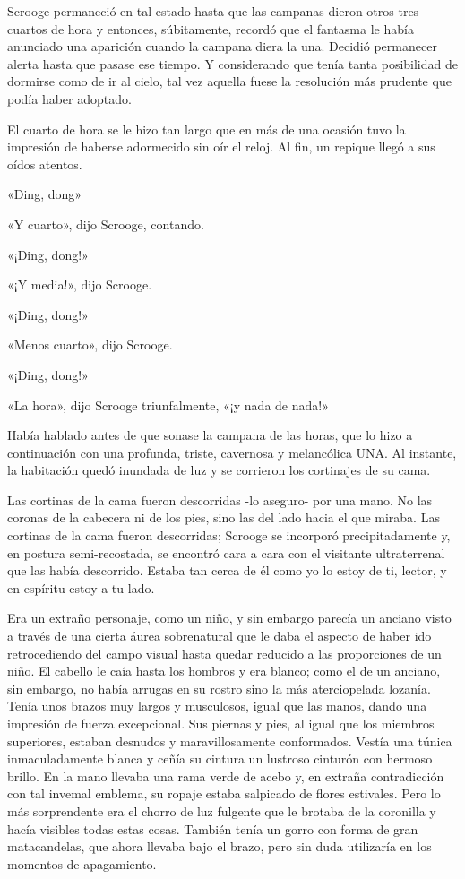 \documentclass{novela}
\begin{document}
 Scrooge permaneció en tal estado hasta que las campanas dieron otros tres cuartos de hora y entonces, súbitamente, recordó que el fantasma le había anunciado una aparición cuando la campana diera la una. Decidió permanecer alerta hasta que pasase ese tiempo. Y considerando que tenía tanta posibilidad de dormirse como de ir al cielo, tal vez aquella fuese la resolución más prudente que podía haber adoptado.

 El cuarto de hora se le hizo tan largo que en más de una ocasión tuvo la impresión de haberse adormecido sin oír el reloj. Al fin, un repique llegó a sus oídos atentos.

 «Ding, dong»

 «Y cuarto», dijo Scrooge, contando.

 «¡Ding, dong!»

 «¡Y media!», dijo Scrooge.





 «¡Ding, dong!»

 «Menos cuarto», dijo Scrooge.

 «¡Ding, dong!»

 «La hora», dijo Scrooge triunfalmente, «¡y nada de nada!»

 Había hablado antes de que sonase la campana de las horas, que lo hizo a continuación con una profunda, triste, cavernosa y melancólica UNA\@. Al instante, la habitación quedó inundada de luz y se corrieron los cortinajes de su cama.

 Las cortinas de la cama fueron descorridas -lo aseguro- por una mano. No las coronas de la cabecera ni de los pies, sino las del lado hacia el que miraba. Las cortinas de la cama fueron descorridas; Scrooge se incorporó precipitadamente y, en postura semi-recostada, se encontró cara a cara con el visitante ultraterrenal que las había descorrido. Estaba tan cerca de él como yo lo estoy de ti, lector, y en espíritu estoy a tu lado.

 Era un extraño personaje, como un niño, y sin embargo parecía un anciano visto a través de una cierta áurea sobrenatural que le daba el aspecto de haber ido retrocediendo del campo visual hasta quedar reducido a las proporciones de un niño. El cabello le caía hasta los hombros y era blanco; como el de un anciano, sin embargo, no había arrugas en su rostro sino la más aterciopelada lozanía. Tenía unos brazos muy largos y musculosos, igual que las manos, dando una impresión de fuerza excepcional. Sus piernas y pies, al igual que los miembros superiores, estaban desnudos y maravillosamente conformados. Vestía una túnica inmaculadamente blanca y ceñía su cintura un lustroso cinturón con hermoso brillo. En la mano llevaba una rama verde de acebo y, en extraña contradicción con tal invemal emblema, su ropaje estaba salpicado de flores estivales. Pero lo más sorprendente era el chorro de luz fulgente que le brotaba de la coronilla y hacía visibles todas estas cosas. También tenía un gorro con forma de gran matacandelas, que ahora llevaba bajo el brazo, pero sin duda utilizaría en los momentos de apagamiento.
\end{document}
